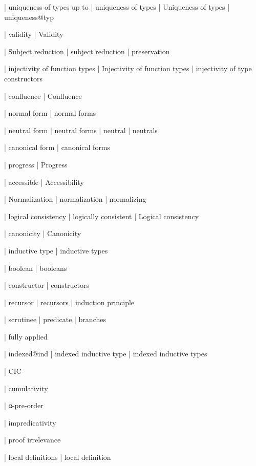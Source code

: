   | uniqueness of types up to
  | uniqueness of types
  | Uniqueness of types
  | uniqueness@typ

  | validity
  | Validity

  | Subject reduction
  | subject reduction
  | preservation

  | injectivity of function types
  | Injectivity of function types
  | injectivity of type constructors

  | confluence
  | Confluence

  | normal form
  | normal forms

  | neutral form
  | neutral forms
  | neutral
  | neutrals

  | canonical form
  | canonical forms

  | progress
  | Progress

  | accessible
  | Accessibility

  | Normalization
  | normalization
  | normalizing

  | logical consistency
  | logically consistent
  | Logical consistency

  | canonicity
  | Canonicity

  | inductive type
  | inductive types

  | boolean
  | booleans

  | constructor
  | constructors

  | recursor
  | recursors
  | induction principle

  | scrutinee
  | predicate
  | branches

  | fully applied

  | indexed@ind
  | indexed inductive type
  | indexed inductive types

  | CIC-


  | cumulativity

  | α-pre-order

  | impredicativity

  | proof irrelevance

  | local definitions
  | local definition

